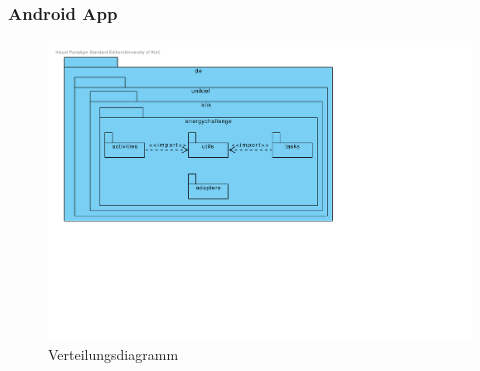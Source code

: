 
\subsubsection{Android App}

\begin{figure}[H]
  \centering
  \includegraphics[width=\textwidth, trim=1cm 11cm 4cm 1cm, clip]{gfx/app_package_diagram}
  \caption{Verteilungsdiagramm}
\end{figure}

